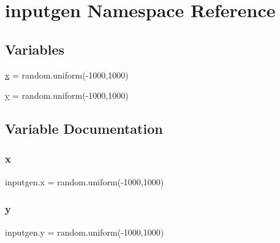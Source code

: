 \hypertarget{namespaceinputgen}{}\section{inputgen Namespace Reference}
\label{namespaceinputgen}
\subsection*{Variables}
\begin{DoxyCompactItemize}
\item 
\mbox{\hyperlink{namespaceinputgen_ac3a90390ff37449b833f97eff9619994}{x}} = random.\+uniform(-\/1000,1000)
\item 
\mbox{\hyperlink{namespaceinputgen_abd97dadd971c8f99e422b56669933508}{y}} = random.\+uniform(-\/1000,1000)
\end{DoxyCompactItemize}


\subsection{Variable Documentation}
\mbox{\label{namespaceinputgen_ac3a90390ff37449b833f97eff9619994}} 
\subsubsection{\texorpdfstring{x}{x}}
{\footnotesize\ttfamily inputgen.\+x = random.\+uniform(-\/1000,1000)}

\mbox{\label{namespaceinputgen_abd97dadd971c8f99e422b56669933508}} 
\subsubsection{\texorpdfstring{y}{y}}
{\footnotesize\ttfamily inputgen.\+y = random.\+uniform(-\/1000,1000)}

